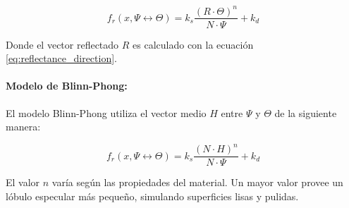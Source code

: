 \begin{equation}
    f_{r}(x, \Psi\leftrightarrow\Theta) = k_{s}\frac{(R\cdot \Theta)^n}{N\cdot\Psi} + k_{d}
    \label{eq:phong}
\end{equation}

Donde el vector reflectado $R$ es calculado con la ecuación \ref{eq:reflectance_direction}.

\paragraph{Modelo de Blinn-Phong:}
\label{para:blinn_phong}
El modelo Blinn-Phong utiliza el vector medio $H$ entre $\Psi$ y $\Theta$ de la siguiente manera:

\begin{equation}
    f_{r}(x, \Psi\leftrightarrow\Theta) = k_{s}\frac{(N\cdot H)^n}{N\cdot\Psi} + k_{d}
    \label{eq:blinn_phong_pr}
\end{equation}

El valor $n$ varía según las propiedades del material. Un mayor valor provee un lóbulo especular más pequeño, simulando superficies lisas y pulidas.


